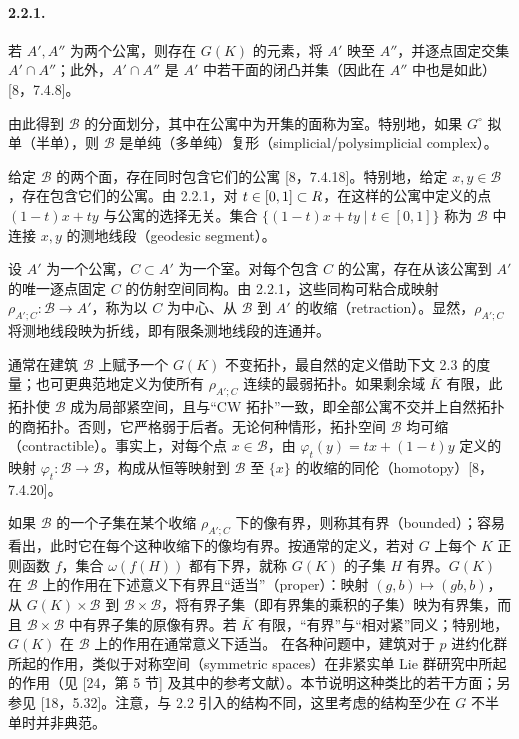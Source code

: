 \paragraph*{2.2.1.}若 $A',A''$ 为两个公寓，则存在 $G(K)$ 的元素，将 $A'$ 映至 $A''$，并逐点固定交集 $A'\cap A''$；此外，$A'\cap A''$ 是 $A'$ 中若干面的闭凸并集（因此在 $A''$ 中也是如此）[8，7.4.8]。

由此得到 $\mathscr B$ 的分面划分，其中在公寓中为开集的面称为室。特别地，如果 $G^\circ$ 拟单（半单），则 $\mathscr B$ 是单纯（多单纯）复形（simplicial/polysimplicial complex）。

给定 $\mathscr B$ 的两个面，存在同时包含它们的公寓 [8，7.4.18]。特别地，给定 $x,y\in\mathscr B$，存在包含它们的公寓。由 2.2.1，对 $t\in[0,1]\subset R$，在这样的公寓中定义的点 $(1-t)x+ty$ 与公寓的选择无关。集合 $\{(1-t)x+ty\mid t\in[0,1]\}$ 称为 $\mathscr B$ 中连接 $x,y$ 的测地线段（geodesic segment）。

设 $A'$ 为一个公寓，$C\subset A'$ 为一个室。对每个包含 $C$ 的公寓，存在从该公寓到 $A'$ 的唯一逐点固定 $C$ 的仿射空间同构。由 2.2.1，这些同构可粘合成映射 $\rho_{A';C}:\mathscr B\to A'$，称为以 $C$ 为中心、从 $\mathscr B$ 到 $A'$ 的收缩（retraction）。显然，$\rho_{A';C}$ 将测地线段映为折线，即有限条测地线段的连通并。

通常在建筑 $\mathscr B$ 上赋予一个 $G(K)$ 不变拓扑，最自然的定义借助下文 2.3 的度量；也可更典范地定义为使所有 $\rho_{A';C}$ 连续的最弱拓扑。如果剩余域 $\overline K$ 有限，此拓扑使 $\mathscr B$ 成为局部紧空间，且与“CW 拓扑”一致，即全部公寓不交并上自然拓扑的商拓扑。否则，它严格弱于后者。无论何种情形，拓扑空间 $\mathscr B$ 均可缩（contractible）。事实上，对每个点 $x\in\mathscr B$，由 $\varphi_t(y)=tx+(1-t)y$ 定义的映射 $\varphi_t:\mathscr B\to\mathscr B$，构成从恒等映射到 $\mathscr B$ 至 $\{x\}$ 的收缩的同伦（homotopy）[8，7.4.20]。

如果 $\mathscr B$ 的一个子集在某个收缩 $\rho_{A';C}$ 下的像有界，则称其有界（bounded）；容易看出，此时它在每个这种收缩下的像均有界。按通常的定义，若对 $G$ 上每个 $K$ 正则函数 $f$，集合 $\omega(f(H))$ 都有下界，就称 $G(K)$ 的子集 $H$ 有界。$G(K)$ 在 $\mathscr B$ 上的作用在下述意义下有界且“适当”（proper）：映射 $(g,b)\mapsto(gb,b)$，从 $G(K)\times\mathscr B$ 到 $\mathscr B\times\mathscr B$，将有界子集（即有界集的乘积的子集）映为有界集，而且 $\mathscr B\times\mathscr B$ 中有界子集的原像有界。若 $\overline K$ 有限，“有界”与“相对紧”同义；特别地，$G(K)$ 在 $\mathscr B$ 上的作用在通常意义下适当。
在各种问题中，建筑对于 $p$ 进约化群所起的作用，类似于对称空间（symmetric spaces）在非紧实单 Lie 群研究中所起的作用（见 [24，第 5 节] 及其中的参考文献）。本节说明这种类比的若干方面；另参见 [18，5.32]。注意，与 2.2 引入的结构不同，这里考虑的结构至少在 $G$ 不半单时并非典范。

